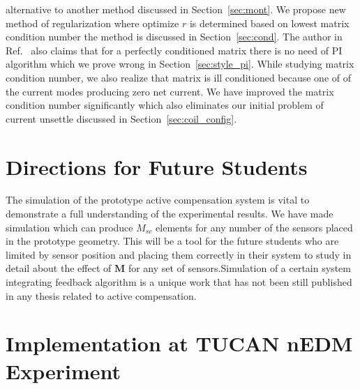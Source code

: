 alternative to another method discussed in Section~\ref{sec:mont}. We propose new method of regularization where optimize $r$ is determined based on lowest matrix condition number the method is discussed in Section~\ref{sec:cond}. The author in Ref.~\cite{rawlik} also claims that for a perfectly conditioned matrix there is no need of PI algorithm which we prove wrong in Section~\ref{sec:style_pi}. While studying matrix condition number, we also realize that matrix is ill conditioned because one of of the current modes producing zero net current. We have improved the matrix condition number significantly which also eliminates our initial problem of current unsettle discussed in Section~\ref{sec:coil_config}.

\section{Directions for Future Students}

The simulation of the prototype active compensation system is vital to demonstrate a full understanding of the experimental results. We have made simulation which can produce $M_{sc}$ elements for any number of the sensors placed in the prototype geometry. This will be a tool for the future students who are limited by sensor position and placing them correctly in their system to study in detail about the effect of $\bm{M}$ for any set of sensors.Simulation of a certain system integrating feedback algorithm is a unique work that has not been still published in any thesis related to active compensation. 



\section{Implementation at TUCAN nEDM Experiment}



